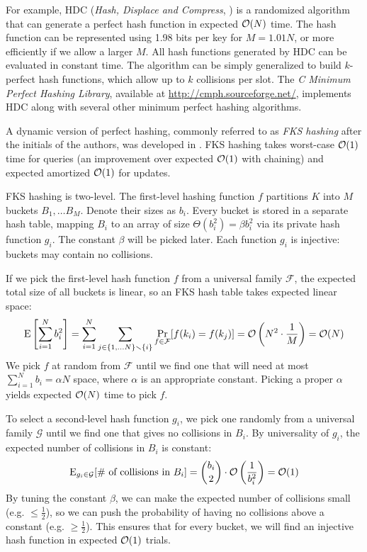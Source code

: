 For example, HDC (\textit{Hash, Displace and Compress},
\cite{hdc-hashing}) is a randomized algorithm that can generate a perfect
hash function in expected $\mathcal{O}(N)$ time. The hash function can be represented
using 1.98 bits per key for $M=1.01 N$, or more efficiently if we allow a larger
$M$. All hash functions generated by HDC can be evaluated in constant time.
The algorithm can be simply generalized to build $k$-perfect hash functions,
which allow up to $k$ collisions per slot. The \textit{C Minimum Perfect
Hashing Library}, available at \url{http://cmph.sourceforge.net/}, implements
HDC along with several other minimum perfect hashing algorithms.

A dynamic version of perfect hashing, commonly referred to as \emph{FKS
hashing} after the initials of the authors, was developed in \cite{fks-hashing}.
FKS hashing takes worst-case $\mathcal{O}(1)$ time for queries (an improvement over
expected $\mathcal{O}(1)$ with chaining) and expected amortized $\mathcal{O}(1)$ for updates.

FKS hashing is two-level. The first-level hashing function $f$ partitions
$K$ into $M$ buckets $B_1,\ldots B_M$. Denote their sizes as $b_i$.
Every bucket is stored in a separate hash table, mapping $B_i$ to an array
of size $\Theta(b_i^2)=\beta b_i^2$ via its private hash function $g_i$.
The constant $\beta$ will be picked later.
Each function $g_i$ is injective: buckets may contain no collisions.

If we pick the first-level hash function $f$ from a universal family
$\mathcal{F}$, the expected total size of all buckets is linear, so an FKS
hash table takes expected linear space:
$$\mathrm{E}\left[\sum_{i=1}^N b_i^2\right]=
	\sum_{i=1}^N \sum_{j\in\{1,\ldots N\}\smallsetminus\{i\}}
	\Pr_{f\in\mathcal{F}}[f(k_i)=f(k_j)]=
	\mathcal{O}\left(N^2\cdot\frac{1}{M}\right)=\mathcal{O}(N)$$
We pick $f$ at random from $\mathcal{F}$ until we find one that will need at
most $\sum_{i=1}^N b_i=\alpha N$ space, where $\alpha$ is an appropriate
constant. Picking a proper $\alpha$ yields expected $\mathcal{O}(N)$ time to pick $f$.

To select a second-level hash function $g_i$, we pick one randomly from
a universal family $\mathcal{G}$ until we find one that gives no collisions
in $B_i$. By universality of $g_i$, the expected number of collisions in $B_i$
is constant:
$$\mathrm{E}_{g_i\in\mathcal{G}}[\text{\# of collisions in }B_i]=
	{b_i\choose 2}\cdot\mathcal{O}\left(\frac{1}{b_i^2}\right)=\mathcal{O}(1)$$
By tuning the constant $\beta$, we can make the expected number of collisions
small (e.g. $\leq\frac{1}{2}$), so we can push the probability of having no
collisions above a constant (e.g. $\geq\frac{1}{2}$). This ensures that for
every bucket, we will find an injective hash function in expected $\mathcal{O}(1)$
trials.

